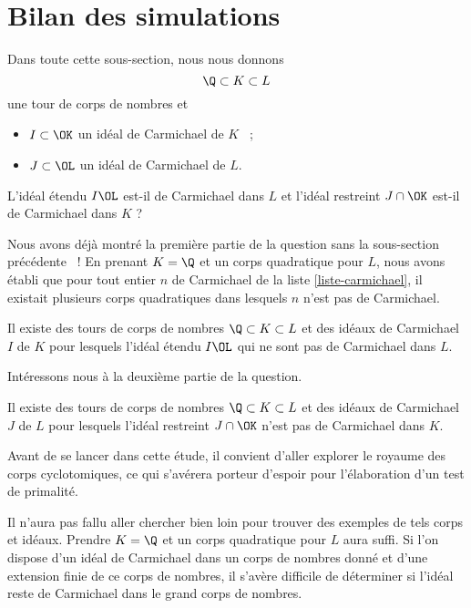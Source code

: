 \section{Bilan des simulations}

Dans toute cette sous-section, nous nous donnons $$\Q\subset K \subset L$$ une tour de corps de nombres et \begin{itemize}
	\item $I\subset \OK$ un idéal de Carmichael de $K$ ~;
	\item $J \subset \OL$ un idéal de Carmichael de $L$.
\end{itemize}

\begin{question}
	L'idéal étendu $I\OL$ est-il de Carmichael dans $L$ et l'idéal restreint $J\cap\OK$ est-il de Carmichael dans $K$ ?
\end{question}

Nous avons déjà montré la première partie de la question sans la sous-section précédente ~! En prenant $K=\Q$ et un corps quadratique pour $L$, nous avons établi que pour tout entier $n$ de Carmichael de la liste \ref{liste-carmichael}, il existait plusieurs corps quadratiques dans lesquels $n$ n'est pas de Carmichael. 

\begin{proposition}\label{premier-ce}
	Il existe des tours de corps de nombres $\Q\subset K \subset L$ et des idéaux de Carmichael $I$ de $K$ pour lesquels l'idéal étendu $I\OL$ qui ne sont pas de Carmichael dans $L$.
\end{proposition}

Intéressons nous à la deuxième partie de la question.

\begin{proposition}\label{deuxieme-ce}
	Il existe des tours de corps de nombres $\Q\subset K \subset L$ et des idéaux de Carmichael $J$ de $L$ pour lesquels l'idéal restreint $J\cap \OK$ n'est pas de Carmichael dans $K$.
\end{proposition}

Avant de se lancer dans cette étude, il convient d'aller explorer le royaume des corps cyclotomiques, ce qui s'avérera porteur d'espoir pour l'élaboration d'un test de primalité. 

Il n'aura pas fallu aller chercher bien loin pour trouver des exemples de tels corps et idéaux. Prendre $K = \Q$ et un corps quadratique pour $L$ aura suffi. Si l'on dispose d'un idéal de Carmichael dans un corps de nombres donné et d'une extension finie de ce corps de nombres, il s'avère difficile de déterminer si l'idéal reste de Carmichael dans le grand corps de nombres.


